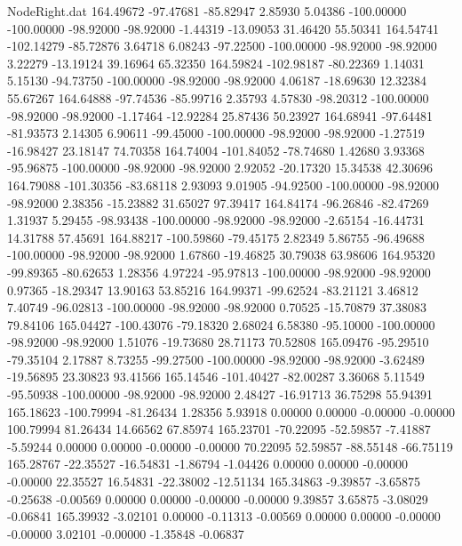\begin{filecontents}{NodeRight.dat}
 164.49672  -97.47681  -85.82947     2.85930    5.04386 -100.00000 -100.00000  -98.92000  -98.92000   -1.44319  -13.09053   31.46420   55.50341
 164.54741 -102.14279  -85.72876     3.64718    6.08243  -97.22500 -100.00000  -98.92000  -98.92000    3.22279  -13.19124   39.16964   65.32350
 164.59824 -102.98187  -80.22369     1.14031    5.15130  -94.73750 -100.00000  -98.92000  -98.92000    4.06187  -18.69630   12.32384   55.67267
 164.64888  -97.74536  -85.99716     2.35793    4.57830  -98.20312 -100.00000  -98.92000  -98.92000   -1.17464  -12.92284   25.87436   50.23927
 164.68941  -97.64481  -81.93573     2.14305    6.90611  -99.45000 -100.00000  -98.92000  -98.92000   -1.27519  -16.98427   23.18147   74.70358
 164.74004 -101.84052  -78.74680     1.42680    3.93368  -95.96875 -100.00000  -98.92000  -98.92000    2.92052  -20.17320   15.34538   42.30696
 164.79088 -101.30356  -83.68118     2.93093    9.01905  -94.92500 -100.00000  -98.92000  -98.92000    2.38356  -15.23882   31.65027   97.39417
 164.84174  -96.26846  -82.47269     1.31937    5.29455  -98.93438 -100.00000  -98.92000  -98.92000   -2.65154  -16.44731   14.31788   57.45691
 164.88217 -100.59860  -79.45175     2.82349    5.86755  -96.49688 -100.00000  -98.92000  -98.92000    1.67860  -19.46825   30.79038   63.98606
 164.95320  -99.89365  -80.62653     1.28356    4.97224  -95.97813 -100.00000  -98.92000  -98.92000    0.97365  -18.29347   13.90163   53.85216
 164.99371  -99.62524  -83.21121     3.46812    7.40749  -96.02813 -100.00000  -98.92000  -98.92000    0.70525  -15.70879   37.38083   79.84106
 165.04427 -100.43076  -79.18320     2.68024    6.58380  -95.10000 -100.00000  -98.92000  -98.92000    1.51076  -19.73680   28.71173   70.52808
 165.09476  -95.29510  -79.35104     2.17887    8.73255  -99.27500 -100.00000  -98.92000  -98.92000   -3.62489  -19.56895   23.30823   93.41566
 165.14546 -101.40427  -82.00287     3.36068    5.11549  -95.50938 -100.00000  -98.92000  -98.92000    2.48427  -16.91713   36.75298   55.94391
 165.18623 -100.79994  -81.26434     1.28356    5.93918    0.00000    0.00000   -0.00000   -0.00000  100.79994   81.26434   14.66562   67.85974
 165.23701  -70.22095  -52.59857    -7.41887   -5.59244    0.00000    0.00000   -0.00000   -0.00000   70.22095   52.59857  -88.55148  -66.75119
 165.28767  -22.35527  -16.54831    -1.86794   -1.04426    0.00000    0.00000   -0.00000   -0.00000   22.35527   16.54831  -22.38002  -12.51134
 165.34863   -9.39857   -3.65875    -0.25638   -0.00569    0.00000    0.00000   -0.00000   -0.00000    9.39857    3.65875   -3.08029   -0.06841
 165.39932   -3.02101    0.00000    -0.11313   -0.00569    0.00000    0.00000   -0.00000   -0.00000    3.02101   -0.00000   -1.35848   -0.06837

\end{filecontents}
